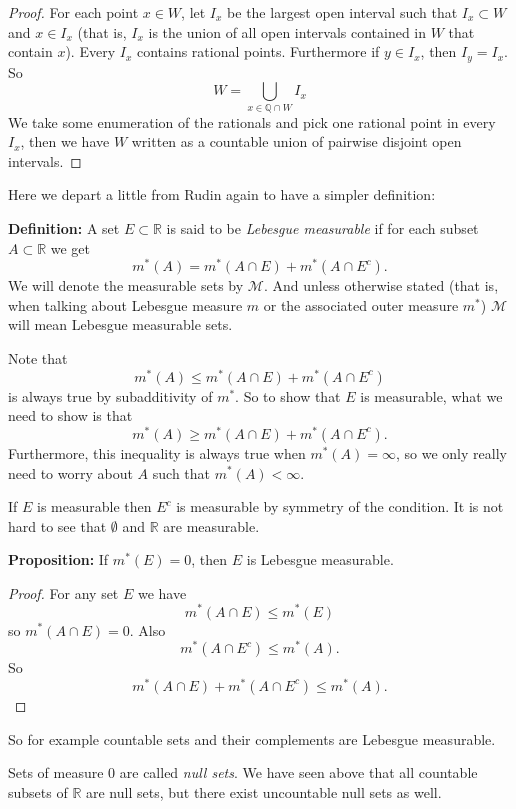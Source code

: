 \documentclass[12pt]{book}
\newcommand{\R}{{\mathbb{R}}}
\newcommand{\Q}{{\mathbb{Q}}}
\newcommand{\sM}{{\mathcal{M}}}
\theoremstyle{plain}
\theoremstyle{remark}
\theoremstyle{definition}
\theoremstyle{exercise}
\theoremstyle{example}
\begin{document}
\begin{proof}
For each point $x \in W$, let $I_x$ be the largest open interval such
that $I_x \subset W$ and $x \in I_x$ (that is, $I_x$ is the union of all
open intervals contained in $W$ that contain $x$).  Every $I_x$ contains
rational points.  Furthermore if $y \in I_x$, then $I_y = I_x$.  So
$$
W = \bigcup_{x \in \Q \cap W} I_x
$$
We take some enumeration of the rationals and pick one rational
point in every $I_x$, then we have $W$ written as a countable union of
pairwise disjoint open intervals.
\end{proof}

\medskip

Here we depart a little from Rudin again to have a simpler definition:

\textbf{Definition:}
A set $E \subset \R$ is said to be \emph{Lebesgue measurable}
if for each subset $A \subset \R$ we get
$$
m^*(A) = m^*(A \cap E) + m^*(A \cap E^c) .
$$
We will denote the measurable sets by $\sM$.  And unless otherwise stated
(that is, when talking about Lebesgue measure $m$ or the associated outer
measure $m^*$) $\sM$ will mean Lebesgue measurable sets.

Note that
$$
m^*(A) \leq m^*(A \cap E) + m^*(A \cap E^c)
$$
is always true by subadditivity of $m^*$.  So to show that $E$ is measurable,
what we need to show is that
$$
m^*(A) \geq m^*(A \cap E) + m^*(A \cap E^c).
$$
Furthermore, this inequality is always true when $m^*(A) = \infty$, so
we only really need to worry about $A$ such that $m^*(A) < \infty$.

If $E$ is measurable then $E^c$ is measurable by symmetry of the
condition.  It is not hard
to see that $\emptyset$ and $\R$ are measurable.

\medskip

\textbf{Proposition:}
If $m^*(E) = 0$, then $E$ is Lebesgue measurable.

\medskip

\begin{proof}
For any set $E$ we have
$$
m^*(A \cap E) \leq m^*(E)
$$
so $m^*(A \cap E) = 0$.  Also
$$
m^*(A \cap E^c) \leq m^*(A) .
$$
So
$$
m^*(A \cap E) + m^*(A \cap E^c) \leq m^*(A) .
$$
\end{proof}

\medskip

So for example countable sets and their complements are Lebesgue measurable.

\medskip

Sets of measure 0 are called \emph{null sets}.  We have seen above that all
countable subsets of $\R$ are null sets, but there exist 
uncountable null sets as well.
\end{document}
